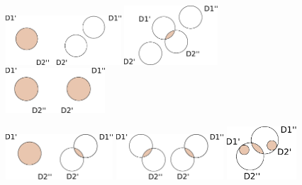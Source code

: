 \documentclass[11pt]{article}
\begin{document}
\begin{figure}[!htb]
%
    \centering
  \includegraphics[width=4.3cm]{CaseDifferentiation/CaseDifferentiation_2SameDim_Cross_1DimAllDePairPartnered_1DimNoDePairPartnered.pdf}
  \label{}
\endminipage
{}
    \centering
    \includegraphics[width=3.5cm]{CaseDifferentiation/CaseDifferentiation_2SameDim_Cross_1DimSomeDePairPartnered_1DimNoDePairPartnered.pdf}
  \label{}
\endminipage\hfill
{}%
    \centering
  \includegraphics[width=3.7cm]{CaseDifferentiation/CaseDifferentiation_2SameDim_Cross_1DimAllDePairPartnered_Cross_1DimAllDePairPartnered.pdf}
  \label{}
\endminipage
\end{figure}

\begin{figure}[!htb]
%
    \centering
  \includegraphics[width=4cm]{CaseDifferentiation/CaseDifferentiation_2SameDim_Cross_1DimAllDePairPartnered_Cross_1DimSomeDePairPartnered.pdf}
  \label{}
\endminipage
{}
    \centering
    \includegraphics[width=4cm]{CaseDifferentiation/CaseDifferentiation_2SameDim_Cross_1DimSomeDePairPartnered_Cross_1DimSomeDePairPartnered.pdf}
  \label{}
\endminipage\hfill
{}
    \centering
    \includegraphics[width=2.6cm]{CaseDifferentiation/CaseDifferentiation_2SameDim_Cross_1DimSomeDePairPartnered_Cross_1DimSomeDePairPartnered_SameDSDimShareSameDe.pdf}
  \label{}
\endminipage\hfill
\end{figure}
\end{document}
